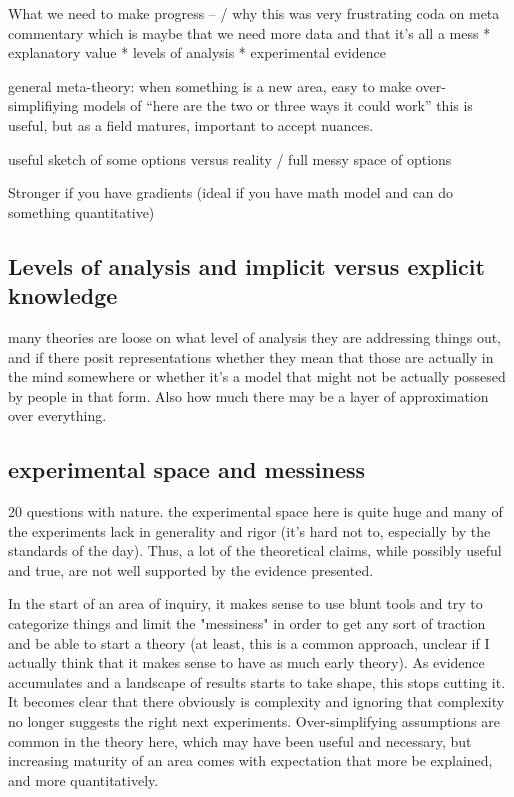 \documentclass[]{article}
\begin{document}
What we need to make progress -- / why this was very frustrating 
coda on meta commentary which is maybe that we need more data and that it's all a mess 
* explanatory value
* levels of analysis
* experimental evidence

general meta-theory: when something is a new area, easy to make over-simplifiying models of “here are the two or three ways it could work” this is useful, but as a field matures, important to accept nuances.

useful sketch of some options versus reality / full messy space of options

Stronger if you have gradients (ideal if you have math model and can do something quantitative)

\subsection{ Levels of analysis and implicit versus explicit knowledge}
many theories are loose on what level of analysis they are addressing things out, and if there posit representations whether they mean that those are actually in the mind somewhere or whether it's a model that might not be actually possesed by people in that form. Also how much there may be a layer of approximation over everything. 

\subsection{experimental space and messiness}
20 	questions with nature. 
the experimental space here is quite huge and many of the experiments lack in generality and rigor (it's hard not to, especially by the standards of the day). Thus, a lot of the theoretical claims, while possibly useful and true, are not well supported by the evidence presented. 

In the start of an area of inquiry, it makes sense to use blunt tools and try to categorize things and limit the "messiness" in order to get any sort of traction and be able to start a theory (at least, this is a common approach, unclear if I actually think that it makes sense to have as much early theory). As evidence accumulates and a landscape of results starts to take shape, this stops cutting it. It becomes clear that there obviously is complexity and ignoring that complexity no longer suggests the right next experiments. Over-simplifying assumptions are common in the theory here, which may have been useful and necessary, but increasing maturity of an area comes with expectation that more be explained, and more quantitatively. 
\end{document}
